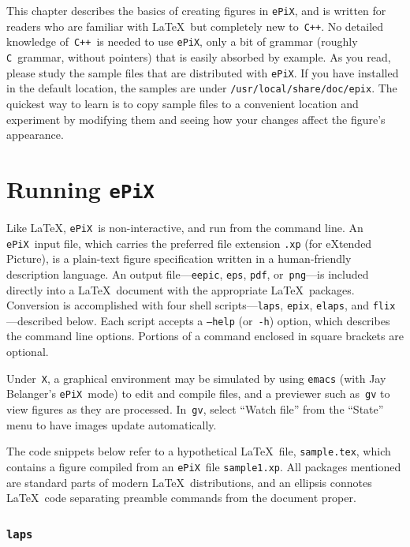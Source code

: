 \documentclass[12pt]{report}
\newcommand{\code}[1]{\texttt{#1}}
\newcommand{\filename}[1]{\texttt{#1}}
\newcommand{\ePiX}{\code{ePiX}}
\newcommand{\CXX}{\code{C++}}
\begin{document}
This chapter describes the basics of creating figures in \ePiX, and is
written for readers who are familiar with \LaTeX\ but completely new
to~\CXX. No detailed knowledge of~\CXX\ is needed to use \ePiX, only a
bit of grammar (roughly \code{C}~grammar, without pointers) that is
easily absorbed by example.  As you read, please study the sample
files that are distributed with \ePiX. If you have installed in the
default location, the samples are under
\filename{/usr/local/share/doc/epix}. The quickest way to learn is to
copy sample files to a convenient location and experiment by modifying
them and seeing how your changes affect the figure's appearance.

\section{Running \ePiX}
\label{section:running}

Like \LaTeX, \ePiX\ is non-interactive, and run from the command
line. An \ePiX\ input file, which carries the preferred file extension
\filename{.xp} (for eXtended Picture), is a plain-text figure
specification written in a human-friendly description language. An
output file---\code{eepic}, \code{eps}, \code{pdf}, or~\code{png}---is
included directly into a \LaTeX\ document with the appropriate \LaTeX\
packages. Conversion is accomplished with four shell
scripts---\code{laps}, \code{epix}, \code{elaps}, and
\code{flix}---described below. Each script accepts a \code{--help}
(or~\code{-h}) option, which describes the command line
options. Portions of a command enclosed in square brackets are
optional.

Under~\code{X}, a graphical environment may be simulated by using
\code{emacs} (with Jay Belanger's \ePiX\ mode) to edit and compile
files, and a previewer such as~\code{gv} to view figures as they are
processed. In~\code{gv}, select ``Watch file'' from the ``State'' menu
to have images update automatically.\index{Graphical interface}

The code snippets below refer to a hypothetical \LaTeX\ file,
\filename{sample.tex}, which contains a figure compiled from an \ePiX\
file \filename{sample1.xp}. All packages mentioned are standard parts
of modern \LaTeX\ distributions, and an ellipsis connotes \LaTeX\ code
separating preamble commands from the document proper.


\subsubsection*{\code{laps}}
\end{document}
